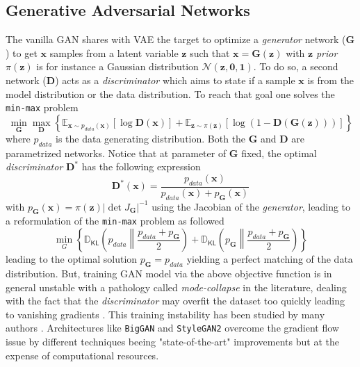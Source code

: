 \documentclass[11pt]{amsart}
\newcommand{\Esp}[0]{\ensuremath{\mathbb{E}}}
\newcommand{\DKL}[0]{\ensuremath{\mathbb{D}_{\mathsf{KL}}}}
\begin{document}
\subsection{Generative Adversarial Networks}
%
The vanilla GAN \citep{goodfellow2014generative} shares with VAE the target to optimize a \textit{generator} network ($\bm{G}$) to get $\bm{x}$ samples from a latent variable $\bm{z}$ such that  $\bm{x} = \bm{G}(\bm{z})$ with $\bm{z}$ \textit{prior} $\pi(\bm{z})$ is for instance a Gaussian distribution $\mathcal{N}(\bm{z},\bm{0},\bm{1})$. To do so, a second network ($\bm{D}$) acts as a \textit{discriminator} which aims to state if a sample $\bm{x}$ is from the model distribution or the data distribution. To reach that goal one solves the \texttt{min-max} problem
\begin{equation}
\min_{\bm{G}} \max_{\bm{D}}\left\{ \Esp_{\bm{x}\sim p_{data}(\bm{x})}[\log \bm{D}(\bm{x})] + \Esp_{\bm{z}\sim \pi(\bm{z})}[\log(1-\bm{D}(\bm{G}(\bm{z})))] \right\}
\end{equation} 
where $p_{data}$ is the data generating distribution. Both the  $\bm{G}$ and $\bm{D}$ are parametrized networks. Notice that at parameter of $\bm{G}$ fixed, the optimal \textit{discriminator} $\bm{D}^\ast$ has the following expression
\begin{equation}
\bm{D}^\ast(\bm{x}) = \frac{p_{data}(\bm{x})}{p_{data}(\bm{x}) + p_{\bm{G}}(\bm{x})}
\end{equation}
with $p_{\bm{G}}(\bm{x}) = \pi(\bm{z})|\det J_{\bm{G}} |^{-1}$ using the Jacobian of the \textit{generator}, leading to a reformulation of the \texttt{min-max} problem as followed
\begin{equation}
\min_G \left\{ \DKL{\left( p_{data} \left\| \frac{p_{data} + p_{\bm{G}}}{2}\right. \right) }  + \DKL{\left(p_{\bm{G}} \left\| \frac{p_{data} + p_{\bm{G}}}{2} \right. \right)} \right\}
\end{equation}
leading to the optimal solution $p_{\bm{G}} = p_{data}$ yielding a perfect matching of the data distribution.  But, training GAN model via the above objective function is in general unstable with a pathology called \textit{mode-collapse} in the literature, dealing with the fact that the \textit{discriminator} may overfit the dataset too quickly leading to vanishing gradients \citep{Gulrajani2017}. This training instability has been studied by many authors \citep[see e.g.][for some reviews]{Saxena2021,Jozdani2022}. Architectures like \texttt{BigGAN} \citep{Brock2019} and \texttt{StyleGAN2} \cite{Karras2018ASG,Karras2020} overcome the gradient flow issue by different techniques beeing "state-of-the-art" improvements but at the expense of computational resources. 
\end{document}
